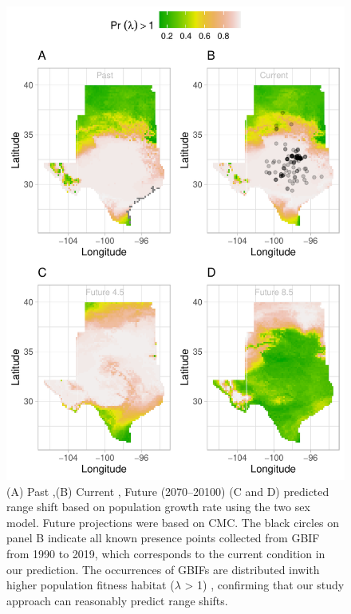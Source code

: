 \documentclass[12pt]{article}
\begin{document}
\begin{figure}[H]
  \begin{center}
    \includegraphics[width=0.75\linewidth]{Figures/Fig_geoPrlambdaprojection_cmc.pdf}
  \caption{(A) Past ,(B) Current , Future (2070–20100) (C and D) predicted range shift based on population growth rate using the two sex model. Future projections were based on CMC. The black circles on panel B indicate all known presence points collected from GBIF from 1990 to 2019, which corresponds to the current condition in our prediction.  The occurrences of GBIFs are distributed inwith higher population fitness habitat ($\lambda$ > 1) , confirming that our study approach can reasonably predict range shifts. }
  \label{fig:geoprojcmc}
  \end{center}
\end{figure}
\end{document}
